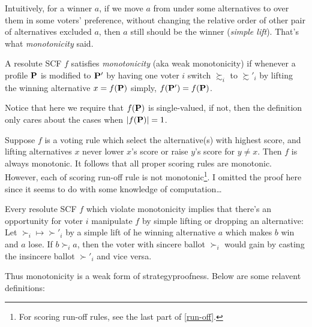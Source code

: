 \noindent Intuitively, for a winner $a$, if we move $a$ from under some alternatives to over them in some voters' preference, without changing the relative order of other pair of alternatives excluded $a$, then $a$ still should be the winner (\textit{simple lift}). That's what \textit{monotonicity} said.

\begin{definition}
    A resolute SCF $f$ satisfies \textit{monotonicity} (aka weak monotonicity) if whenever a profile $\mathbf{P}$ is modified to $\mathbf{P}'$ by having one voter $i$ switch $\succsim_i$ to $\succsim'_i$ by lifting the winning alternative $x = f(\mathbf{P})$ simply, $f(\mathbf{P}') = f(\mathbf{P})$.
\end{definition}

Notice that here we require that $f(\mathbf{P})$ is single-valued, if not, then the definition only cares about the cases when $|f(\mathbf{P})| = 1$.

Suppose $f$ is a voting rule which select the alternative(s) with highest score, and lifting alternatives $x$ never lower $x$'s score or raise $y$'s score for $ y \neq x$. Then $f$ is always monotonic. It follows that all proper scoring rules are monotonic.
However, each of scoring run-off rule is not monotonic\footnote{For scoring run-off rules, see the last part of \cref{run-off}.}. I omitted the proof here since it seems to do with some knowledge of computation\dots

\begin{remark}
    Every resolute SCF $f$ which violate monotonicity implies that there's an opportunity for voter $i$ manipulate $f$ by simple lifting or dropping an alternative:\\
    Let $\succ_i \mapsto \succ'_i$ by a simple lift of he winning alternative $a$ which makes $b$ win and $a$ lose. If $b \succ_i a$, then the voter with sincere ballot $\succ_i$ would gain by casting the insincere ballot $\succ'_i$ and vice versa.
\end{remark}

Thus monotonicity is a weak form of strategyproofness. Below are some relavent definitions:

